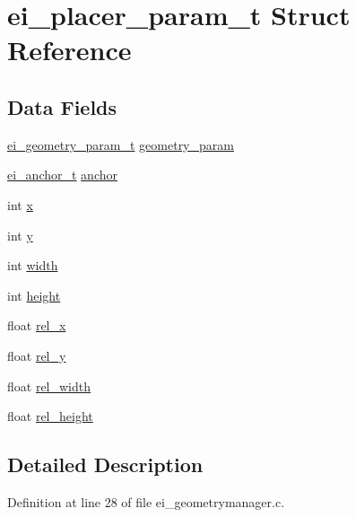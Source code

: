 \hypertarget{structei__placer__param__t}{\section{ei\-\_\-placer\-\_\-param\-\_\-t Struct Reference}
\label{structei__placer__param__t}
}
\subsection*{Data Fields}
\begin{DoxyCompactItemize}
\item 
\hyperlink{structei__geometry__param__t}{ei\-\_\-geometry\-\_\-param\-\_\-t} \hyperlink{structei__placer__param__t_a9fd43b6cecc002d70372ba1ecd23c65a}{geometry\-\_\-param}
\item 
\hyperlink{ei__types_8h_a3852c963af609d31d7cfcff79c4c8450}{ei\-\_\-anchor\-\_\-t} \hyperlink{structei__placer__param__t_aedec3ec42a08772fc50bfd81357b1f3b}{anchor}
\item 
int \hyperlink{structei__placer__param__t_ae78bc39546bd3ad67ce7eea6cf70f699}{x}
\item 
int \hyperlink{structei__placer__param__t_ac82ce34e765d6021615c06d65b212d50}{y}
\item 
int \hyperlink{structei__placer__param__t_ada4185fa077dbc3a30e5ee97b5e0b50f}{width}
\item 
int \hyperlink{structei__placer__param__t_a6afd5d7535a7c258afec785b21428842}{height}
\item 
float \hyperlink{structei__placer__param__t_a3d5ab41b84ea32b97567bd98fabb1998}{rel\-\_\-x}
\item 
float \hyperlink{structei__placer__param__t_ae1c983cf1add3c3f6e8a61e536a87134}{rel\-\_\-y}
\item 
float \hyperlink{structei__placer__param__t_aac042b88d4f7c449ab9b47faf29d81a7}{rel\-\_\-width}
\item 
float \hyperlink{structei__placer__param__t_a1d5cc7b51946594c42ff65696dc517bb}{rel\-\_\-height}
\end{DoxyCompactItemize}


\subsection{Detailed Description}


Definition at line 28 of file ei\-\_\-geometrymanager.\-c.



